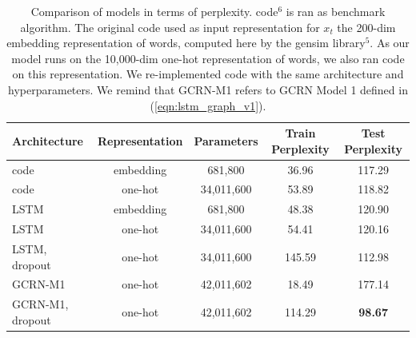 \documentclass{article} %
\newcommand{\eqnref}[1]{(\ref{eqn:#1})}
\begin{document}
\begin{table}[t]
	\centering
	{\small
		\begin{tabular}{lcccc}
			\toprule
			Architecture & Representation & Parameters & Train Perplexity & Test Perplexity  \\
			\midrule
			\citet{zaremba2014recurrent} code\footnotemark[6] & embedding & 681,800 & 36.96 & 117.29 \\
			\citet{zaremba2014recurrent} code\footnotemark[6] & one-hot & 34,011,600 & 53.89 & 118.82 \\
			LSTM & embedding & 681,800 & 48.38 & 120.90 \\
			LSTM & one-hot & 34,011,600 & 54.41 & 120.16 \\
			LSTM, dropout & one-hot & 34,011,600 & 145.59 & 112.98 \\
			GCRN-M1 & one-hot & 42,011,602 & 18.49 & 177.14 \\
			GCRN-M1, dropout & one-hot & 42,011,602 & 114.29 & {\bf 98.67} \\
			\bottomrule
		\end{tabular}
	}
	\caption{Comparison of models in terms of perplexity. \cite{zaremba2014recurrent} code$^6$ is ran as benchmark algorithm. The original \cite{zaremba2014recurrent} code used as input representation for $x_t$ the 200-dim embedding representation of words, computed here by the gensim library$^5$. As our model runs on the 10,000-dim one-hot representation of words, we also ran \cite{zaremba2014recurrent} code on this representation. We re-implemented \cite{zaremba2014recurrent} code with the same architecture and hyperparameters. We remind that GCRN-M1 refers to GCRN Model 1 defined in \eqnref{lstm_graph_v1}.} 
	\label{tab1}
\end{table}
\end{document}
